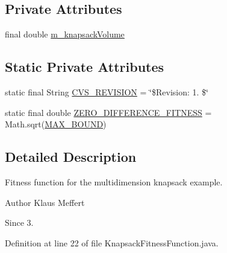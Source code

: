 \subsection*{Private Attributes}
\begin{DoxyCompactItemize}
\item 
final double \hyperlink{classexamples_1_1multidimension_1_1_knapsack_fitness_function_a308518c941040f58423d88a2325397ae}{m\-\_\-knapsack\-Volume}
\end{DoxyCompactItemize}
\subsection*{Static Private Attributes}
\begin{DoxyCompactItemize}
\item 
static final String \hyperlink{classexamples_1_1multidimension_1_1_knapsack_fitness_function_a555b0625de82207f2543bb14f45bf9b0}{C\-V\-S\-\_\-\-R\-E\-V\-I\-S\-I\-O\-N} = \char`\"{}\$Revision\-: 1. \$\char`\"{}
\item 
static final double \hyperlink{classexamples_1_1multidimension_1_1_knapsack_fitness_function_a3a515d570549147e7a463145811d368b}{Z\-E\-R\-O\-\_\-\-D\-I\-F\-F\-E\-R\-E\-N\-C\-E\-\_\-\-F\-I\-T\-N\-E\-S\-S} = Math.\-sqrt(\hyperlink{classexamples_1_1multidimension_1_1_knapsack_fitness_function_ac0c7b5ff45d180a1cebbf7c78391d5ac}{M\-A\-X\-\_\-\-B\-O\-U\-N\-D})
\end{DoxyCompactItemize}


\subsection{Detailed Description}
Fitness function for the multidimension knapsack example.

\begin{DoxyAuthor}{Author}
Klaus Meffert 
\end{DoxyAuthor}
\begin{DoxySince}{Since}
3. 
\end{DoxySince}


Definition at line 22 of file Knapsack\-Fitness\-Function.\-java.




